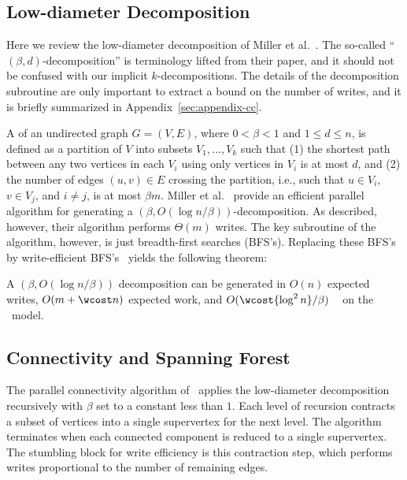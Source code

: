 \subsection{Low-diameter Decomposition}\label{sec:ldd}
Here we review the low-diameter decomposition of Miller et
al.~\cite{miller2013parallel}.  The so-called
``$(\beta,d)$-decomposition'' is terminology lifted from their paper,
and it should not be confused with our implicit
$k$-decompositions. The details of the decomposition subroutine are
only important to extract a bound on the number of writes, and it is
briefly summarized in Appendix~\ref{sec:appendix-cc}.

A  of an undirected graph $G = (V,E)$,
where $0<\beta<1$ and $1\leq d \leq n$, is defined as a partition of
$V$ into subsets $V_1,\ldots,V_k$ such that (1) the shortest path
between any two vertices in each $V_i$ using only vertices in $V_i$ is
at most $d$, and (2) the number of edges $(u,v) \in E$ crossing the
partition, i.e., such that $u \in V_i$, $v \in V_j$, and $i \neq j$,
is at most $\beta m$.
Miller et al.~\cite{miller2013parallel} provide an efficient parallel
algorithm for generating a $(\beta,O(\log n / \beta))$-decomposition.
As described, however, their algorithm performs $\Theta(m)$ writes.
The key subroutine of the algorithm, however, is just breadth-first
searches (BFS's).  Replacing these BFS's by write-efficient
BFS's~\cite{BBFGGMS16} yields the following theorem:

\begin{theorem}\label{thm:ldd}
A $(\beta, O({\log n}/\beta))$ decomposition can be generated in
$O(n)$ expected writes, $O(m+\wcost n)$ expected work, and
$O(\wcost{\log^2 n}/\beta)$ \depth\ \whp{} on the \ourmodel\ model.
\end{theorem}

\subsection{Connectivity and Spanning Forest}\label{sec:cc-linear}
The parallel connectivity algorithm of~\cite{Shun2014} applies the
low-diameter decomposition recursively with $\beta$ set to a
constant less than $1$. Each level of recursion contracts a subset of vertices into
a single supervertex for the next level. The algorithm terminates when
each connected component is reduced to a single supervertex.  The
stumbling block for write efficiency is this contraction step, which
performs writes proportional to the number of remaining edges.

